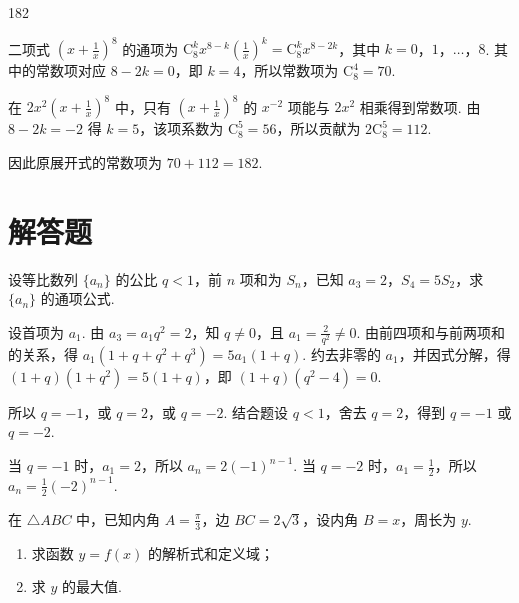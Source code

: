 \begin{answer}
182
\end{answer}

\begin{solution}
二项式 \(\left(x+\frac{1}{x}\right)^8\) 的通项为
\(\mathrm C_8^k x^{8-k}\left(\frac{1}{x}\right)^k=\mathrm C_8^k x^{8-2k}\)，其中 \(k=0\)，\(1\)，\(\ldots\)，\(8\). 其中的常数项对应 \(8-2k=0\)，即 \(k=4\)，所以常数项为 \(\mathrm C_8^4=70\).

在 \(2x^2\left(x+\frac{1}{x}\right)^8\) 中，只有 \(\left(x+\frac{1}{x}\right)^8\) 的 \(x^{-2}\) 项能与 \(2x^2\) 相乘得到常数项. 由 \(8-2k=-2\) 得 \(k=5\)，该项系数为 \(\mathrm C_8^5=56\)，所以贡献为 \(2\mathrm C_8^5=112\).

因此原展开式的常数项为 \(70+112=182\).
\end{solution}

\section{解答题}

\begin{problem}
设等比数列 \(\{a_n\}\) 的公比 \(q<1\)，前 \(n\) 项和为 \(S_n\)，已知 \(a_3=2\)，\(S_4=5S_2\)，求 \(\{a_n\}\) 的通项公式.
\end{problem}

\begin{solution}
设首项为 \(a_1\). 由 \(a_3=a_1q^2=2\)，知 \(q\ne0\)，且 \(a_1=\frac{2}{q^2}\ne0\). 由前四项和与前两项和的关系，得
\(a_1(1+q+q^2+q^3)=5a_1(1+q)\). 约去非零的 \(a_1\)，并因式分解，得
\((1+q)(1+q^2)=5(1+q)\)，即 \((1+q)(q^2-4)=0\).

所以 \(q=-1\)，或 \(q=2\)，或 \(q=-2\). 结合题设 \(q<1\)，舍去 \(q=2\)，得到 \(q=-1\) 或 \(q=-2\).

当 \(q=-1\) 时，\(a_1=2\)，所以 \(a_n=2(-1)^{n-1}\). 当 \(q=-2\) 时，\(a_1=\frac12\)，所以 \(a_n=\frac12(-2)^{n-1}\).
\end{solution}

\begin{problem}
在 \(\triangle ABC\) 中，已知内角 \(A=\frac{\pi}{3}\)，边 \(BC=2\sqrt{3}\)，设内角 \(B=x\)，周长为 \(y\).

\begin{enumerate}
\item 求函数 \(y=f(x)\) 的解析式和定义域；
\item 求 \(y\) 的最大值.
\end{enumerate}
\end{problem}


